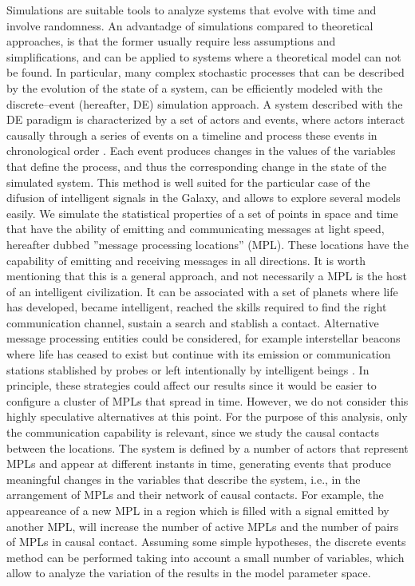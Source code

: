 \documentclass[crop]{CSLB}%
\begin{document}
Simulations are suitable tools to analyze systems that evolve with
time and involve randomness.
%
An advantadge of simulations compared to theoretical approaches, is
that the former usually require less assumptions and simplifications,
and can be applied to systems where a theoretical model can not be
found.
%
In particular, many complex stochastic processes that can be described
by the evolution of the state of a system, can be efficiently modeled
with the discrete--event (hereafter, DE) simulation approach.
%
A system described with the DE paradigm is characterized by a set of
actors and events, where actors interact causally through a series of
events on a timeline and process these events in chronological order
\citep{ptolemaeus_system_2014, chung_simulation_2003,
ross_simulation_2012}.
%
Each event produces changes in the values of the variables that define
the process, and thus the corresponding change in the state of the
simulated system.
%
This method is well suited for the particular case of the difusion of
intelligent signals in the Galaxy, and allows to explore several
models easily.
%
We simulate the statistical properties of a set of points in space and
time that have the ability of emitting and communicating messages at
light speed, hereafter dubbed ''message processing locations'' (MPL).
%
These locations have the capability of emitting and receiving messages
in all directions.
%
It is worth mentioning that this is a general approach, and not
necessarily a MPL is the host of an intelligent civilization.
%
It can be associated with a set of planets where life has developed,
became intelligent, reached the skills required to find the right
communication channel, sustain a search and stablish a contact.
%
Alternative message processing entities could be considered, for
example interstellar beacons where life has ceased to exist but
continue with its emission or communication stations stablished by
probes or left intentionally by intelligent beings \citep[see, e.g.,
][]{peters_outer_2018, barlow_galactic_2013}.
%
In principle, these strategies could affect our results since it would
be easier to configure a cluster of MPLs that spread in time.
%
However, we do not consider this highly speculative alternatives at
this point.
%
%
For the purpose of this analysis, only the communication capability is
relevant, since we study the causal contacts between the locations.
%
%
The system is defined by a number of actors that represent MPLs and
appear at different instants in time, generating events that produce
meaningful changes in the variables that describe the system, i.e., in
the arrangement of MPLs and their network of causal contacts.
%
For example, the appeareance of a new MPL in a region which is filled
with a signal emitted by another MPL, will increase the number of
active MPLs and the number of pairs of MPLs in causal contact.
%
Assuming some simple hypotheses, the discrete events method can be
performed taking into account a small number of variables, which allow
to analyze the variation of the results in the model parameter space.
\end{document}
